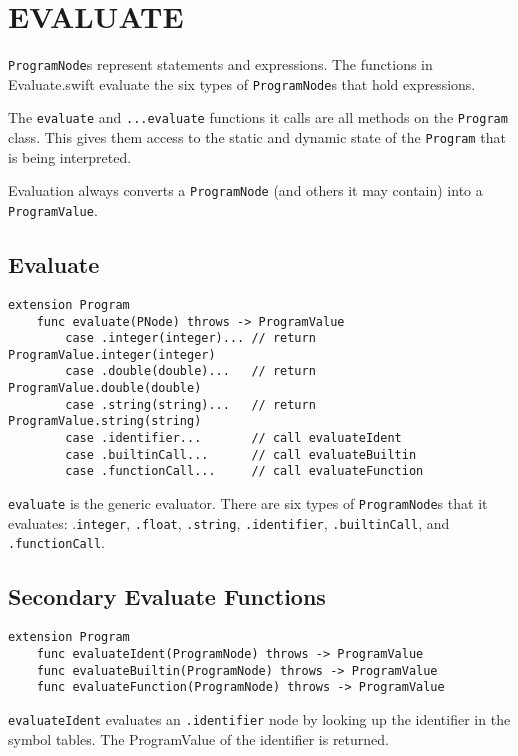 \section{EVALUATE}
\texttt{ProgramNode}s represent statements and expressions. The functions in
Evaluate.swift evaluate the six types of \texttt{ProgramNode}s that
hold expressions.

The \texttt{evaluate} and \texttt{...evaluate} functions it calls are all methods
on the \texttt{Program} class. This gives
them access to the static and dynamic state of the \texttt{Program}
that is being interpreted.

Evaluation always converts a \texttt{ProgramNode} (and others it may contain)
into a \texttt{ProgramValue}.

\subsection{Evaluate}

\begin{verbatim}
extension Program
    func evaluate(PNode) throws -> ProgramValue
        case .integer(integer)... // return ProgramValue.integer(integer)
        case .double(double)...   // return ProgramValue.double(double)
        case .string(string)...   // return ProgramValue.string(string)
        case .identifier...       // call evaluateIdent
        case .builtinCall...      // call evaluateBuiltin
        case .functionCall...     // call evaluateFunction
\end{verbatim}

\texttt{evaluate} is the generic evaluator. There are six types of \texttt{ProgramNode}s
that it evaluates: .\texttt{integer}, \texttt{.float}, \texttt{.string},
\texttt{.identifier}, \texttt{.builtinCall}, and \texttt{.functionCall}.

\subsection{Secondary Evaluate Functions}

\begin{verbatim}
extension Program
    func evaluateIdent(ProgramNode) throws -> ProgramValue
    func evaluateBuiltin(ProgramNode) throws -> ProgramValue
    func evaluateFunction(ProgramNode) throws -> ProgramValue
\end{verbatim}

\texttt{evaluateIdent} evaluates an \texttt{.identifier} node by
looking up the identifier in the symbol tables. The ProgramValue of
the identifier is returned.

